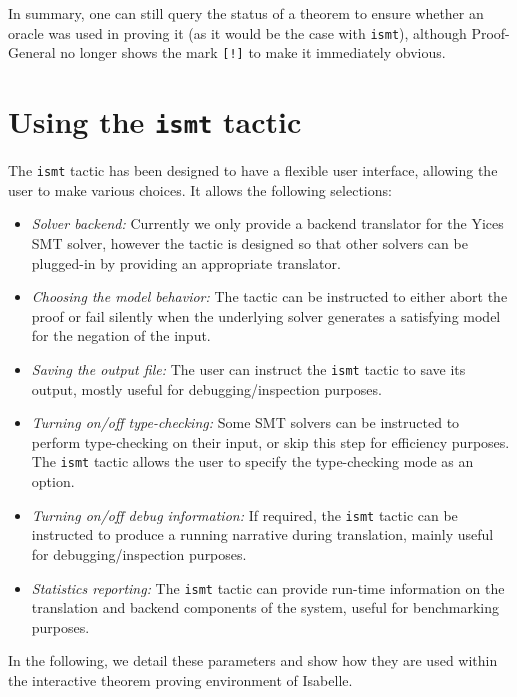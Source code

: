 \documentclass{article}
\begin{document}
In summary, one can still query the status of a theorem to ensure whether an oracle was
used in proving it (as it would be the case with {\tt ismt}), although Proof-General
no longer shows the mark {\tt [!]} to make it immediately obvious.
\section{Using the {\tt ismt} tactic} \label{sec:using}
The {\tt ismt} tactic has been designed to have a flexible user interface, allowing the user
to make various choices. It allows the following selections:
\begin{itemize}
\item {\em Solver backend:} Currently we only provide a backend translator for the Yices SMT solver, however the 
tactic is designed so that
other solvers can be plugged-in by providing an appropriate translator. 

\item {\em Choosing the model behavior:} The tactic can be instructed to either abort the proof or fail silently
when the underlying solver generates a satisfying model for the negation of the input.

\item {\em Saving the output file:} The user can instruct the {\tt ismt} tactic to save its output, mostly 
useful for debugging/inspection purposes.

\item {\em Turning on/off type-checking:} Some SMT solvers can be instructed to perform type-checking on
their input, or skip this step for efficiency purposes. The {\tt ismt} tactic allows the user to specify
the type-checking mode as an option.

\item {\em Turning on/off debug information:} If required, the {\tt ismt} tactic can be instructed to
produce a running narrative during translation, mainly useful for debugging/inspection purposes.

\item {\em Statistics reporting:} The {\tt ismt} tactic can provide run-time information on the translation
and backend components of the system, useful for benchmarking purposes.
\end{itemize}

In the following, we detail these parameters and show how they are used within the interactive 
theorem proving environment of Isabelle.
\end{document}
